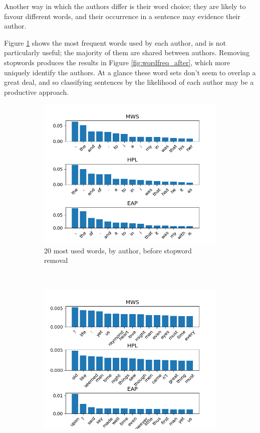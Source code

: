 Another way in which the authors differ is their word choice; they are likely to favour different words, and their occurrence in a sentence may evidence their author.

Figure \ref{fig:wordfreq_before} shows the most frequent words used by each author, and is not particularly useful; the majority of them are shared between authors. Removing stopwords produces the results in Figure \ref{fig:wordfreq_after}, which more uniquely identify the authors. At a glance these word sets don't seem to overlap a great deal, and so classifying sentences by the likelihood of each author may be a productive approach.

\begin{figure}[h]
\centering
\begin{subfigure}[b]{\columnwidth}
\includegraphics[width=\textwidth]{Figures/Data_Structure/wordfreq_before.png}
\caption{20 most used words, by author, before stopword removal}
\label{fig:wordfreq_before}
\end{subfigure} \\
\begin{subfigure}[b]{\columnwidth}
\includegraphics[width=\textwidth]{Figures/Data_Structure/wordfreq_after.png}

\end{subfigure}
\end{figure}
